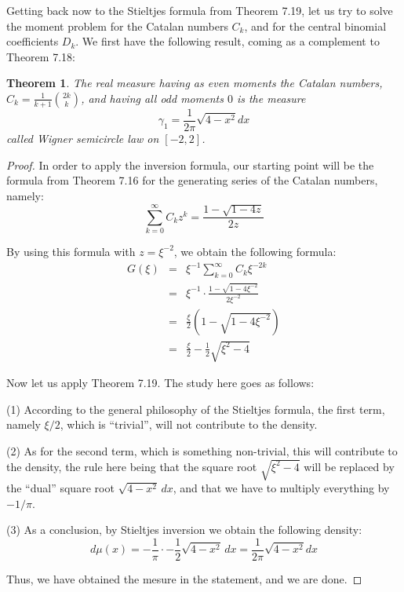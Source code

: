 \documentclass[12pt]{amsbook}
\newtheorem{theorem}{Theorem}[chapter]
\begin{document}
Getting back now to the Stieltjes formula from Theorem 7.19, let us try to solve the moment problem for the Catalan numbers $C_k$, and for the central binomial coefficients $D_k$. We first have the following result, coming as a complement to Theorem 7.18:


\begin{theorem}
The real measure having as even moments the Catalan numbers, $C_k=\frac{1}{k+1}\binom{2k}{k}$, and having all odd moments $0$ is the measure
$$\gamma_1=\frac{1}{2\pi}\sqrt{4-x^2}dx$$
called Wigner semicircle law on $[-2,2]$.
\end{theorem}

\begin{proof}
In order to apply the inversion formula, our starting point will be the formula from Theorem 7.16 for the generating series of the Catalan numbers, namely:
$$\sum_{k=0}^\infty C_kz^k=\frac{1-\sqrt{1-4z}}{2z}$$

By using this formula with $z=\xi^{-2}$, we obtain the following formula:
\begin{eqnarray*}
G(\xi)
&=&\xi^{-1}\sum_{k=0}^\infty C_k\xi^{-2k}\\
&=&\xi^{-1}\cdot\frac{1-\sqrt{1-4\xi^{-2}}}{2\xi^{-2}}\\
&=&\frac{\xi}{2}\left(1-\sqrt{1-4\xi^{-2}}\right)\\
&=&\frac{\xi}{2}-\frac{1}{2}\sqrt{\xi^2-4}
\end{eqnarray*}

Now let us apply Theorem 7.19. The study here goes as follows:

\medskip

(1) According to the general philosophy of the Stieltjes formula, the first term, namely $\xi/2$, which is ``trivial'', will not contribute to the density. 

\medskip

(2) As for the second term, which is something non-trivial, this will contribute to the density, the rule here being that the square root $\sqrt{\xi^2-4}$ will be replaced by the ``dual'' square root $\sqrt{4-x^2}\,dx$, and that we have to multiply everything by $-1/\pi$. 

\medskip

(3) As a conclusion, by Stieltjes inversion we obtain the following density:
$$d\mu(x)
=-\frac{1}{\pi}\cdot-\frac{1}{2}\sqrt{4-x^2}\,dx
=\frac{1}{2\pi}\sqrt{4-x^2}dx$$

Thus, we have obtained the mesure in the statement, and we are done.
\end{proof}
\end{document}
